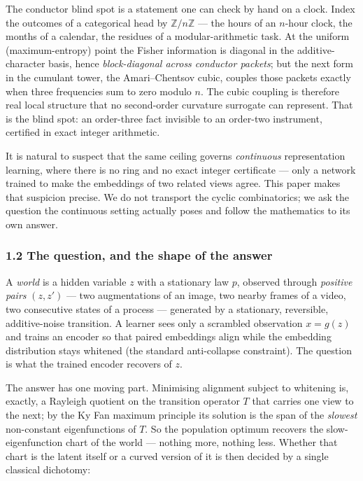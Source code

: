 \documentclass[
  letterpaper,
  11pt]{article}
\theoremstyle{plain}
\theoremstyle{definition}
\theoremstyle{remark}
\begin{document}
The conductor blind spot is a statement one can check by hand on a clock. Index the outcomes of a categorical head by \(\mathbb{Z}/n\mathbb{Z}\) --- the hours of an \(n\)-hour clock, the months of a calendar, the residues of a modular-arithmetic task. At the uniform (maximum-entropy) point the Fisher information is diagonal in the additive-character basis, hence \emph{block-diagonal across conductor packets}; but the next form in the cumulant tower, the Amari--Chentsov cubic, couples those packets exactly when three frequencies sum to zero modulo \(n\). The cubic coupling is therefore real local structure that no second-order curvature surrogate can represent. That is the blind spot: an order-three fact invisible to an order-two instrument, certified in exact integer arithmetic.

It is natural to suspect that the same ceiling governs \emph{continuous} representation learning, where there is no ring and no exact integer certificate --- only a network trained to make the embeddings of two related views agree. This paper makes that suspicion precise. We do not transport the cyclic combinatorics; we ask the question the continuous setting actually poses and follow the mathematics to its own answer.

\subsubsection{1.2 The question, and the shape of the answer}\label{the-question-and-the-shape-of-the-answer}

A \emph{world} is a hidden variable \(z\) with a stationary law \(p\), observed through \emph{positive pairs} \((z,z')\) --- two augmentations of an image, two nearby frames of a video, two consecutive states of a process --- generated by a stationary, reversible, additive-noise transition. A learner sees only a scrambled observation \(x=g(z)\) and trains an encoder so that paired embeddings align while the embedding distribution stays whitened (the standard anti-collapse constraint). The question is what the trained encoder recovers of \(z\).

The answer has one moving part. Minimising alignment subject to whitening is, exactly, a Rayleigh quotient on the transition operator \(T\) that carries one view to the next; by the Ky Fan maximum principle its solution is the span of the \emph{slowest} non-constant eigenfunctions of \(T\). So the population optimum recovers the slow-eigenfunction chart of the world --- nothing more, nothing less. Whether that chart is the latent itself or a curved version of it is then decided by a single classical dichotomy:
\end{document}
